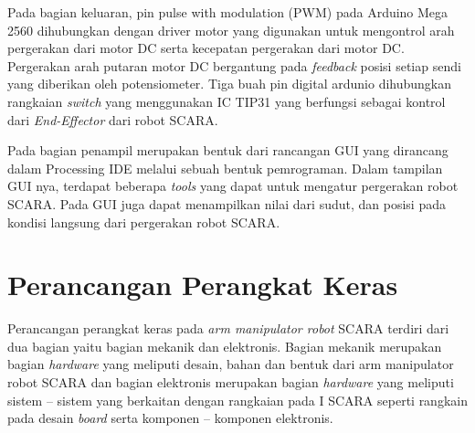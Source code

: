Pada bagian keluaran, pin pulse with modulation (PWM) pada Arduino Mega 2560 dihubungkan dengan driver motor yang digunakan untuk mengontrol arah pergerakan dari motor DC serta kecepatan pergerakan dari motor DC. Pergerakan arah putaran motor DC bergantung pada \textit{feedback} posisi setiap sendi yang diberikan oleh potensiometer. Tiga buah pin digital ardunio dihubungkan rangkaian \textit{switch} yang menggunakan IC TIP31 yang berfungsi sebagai kontrol dari \textit{End-Effector} dari robot SCARA.

Pada bagian penampil merupakan bentuk dari rancangan GUI yang dirancang dalam Processing IDE melalui sebuah bentuk pemrograman. Dalam tampilan GUI nya, terdapat beberapa \textit{tools} yang dapat untuk mengatur pergerakan robot SCARA. Pada GUI juga dapat menampilkan nilai dari sudut, dan posisi pada kondisi langsung dari pergerakan robot SCARA.
\section{ Perancangan Perangkat Keras }
Perancangan perangkat keras pada \textit{arm manipulator robot} SCARA terdiri dari dua bagian yaitu bagian mekanik dan elektronis. Bagian  mekanik merupakan bagian \textit{hardware} yang meliputi desain, bahan dan bentuk dari arm manipulator robot SCARA dan bagian elektronis merupakan bagian \textit{hardware} yang meliputi sistem – sistem yang berkaitan dengan rangkaian pada I SCARA seperti rangkain pada desain \textit{board} serta komponen – komponen elektronis.
